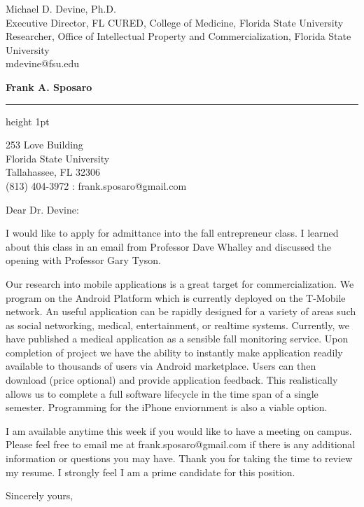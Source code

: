 \documentclass{letter} %
\begin{document}
\signature{Frank A. Sposaro}
\longindentation=0pt                       %
\let\raggedleft\raggedright                %
 
 
\begin{letter}{Michael D. Devine, Ph.D. \\
Executive Director, FL CURED, College of Medicine, Florida State University \\
Researcher, Office of Intellectual Property and Commercialization, Florida State University \\
mdevine@fsu.edu}

\begin{center}
{\large\bf Frank A. Sposaro} 
\end{center}
\medskip\hrule height 1pt
\begin{center}
{253 Love Building \\   
Florida State University \\ 
Tallahassee, FL 32306 \\ 
(813) 404-3972 : frank.sposaro@gmail.com}
\end{center} \vfill %
 
 
\opening{Dear Dr. Devine:} 
 
\noindent I would like to apply for admittance into the fall entrepreneur class.
I learned about this class in an email from Professor Dave Whalley and discussed the opening with Professor Gary Tyson.

 
\noindent Our research into mobile applications is a great target for commercialization. 
We program on the Android Platform which is currently deployed on the T-Mobile network.
An useful application can be rapidly designed for a variety of areas such as social networking, medical, entertainment, or realtime systems.
Currently, we have published a medical application as a sensible fall monitoring service.
Upon completion of project we have the ability to instantly make application readily available to thousands of users via Android marketplace. 
Users can then download (price optional) and provide application feedback.
This realistically allows us to complete a full software lifecycle in the time span of a single semester. Programming for the iPhone enviornment is also a viable option.

 
\noindent I am available anytime this week if you would like to have a meeting on campus. Please feel free to email me at frank.sposaro@gmail.com if there is any additional information or questions you may have. Thank you for taking the time to review my resume. I strongly feel I am a prime candidate for this position. 
 
\closing{Sincerely yours,} 
 

 
\end{letter}
 
\end{document}
